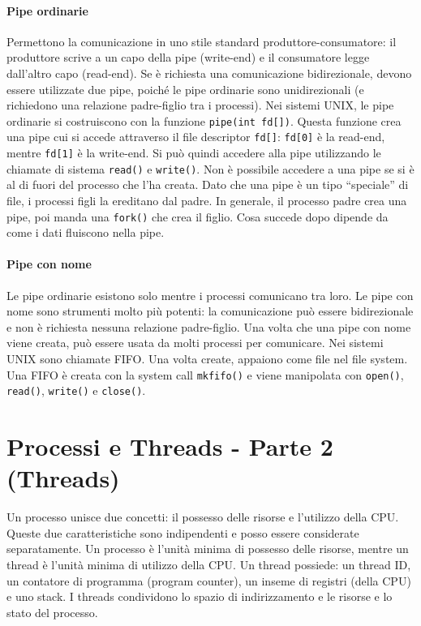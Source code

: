 \documentclass[a4paper]{article}
\begin{document}
\paragraph{Pipe ordinarie} Permettono la comunicazione in uno stile standard produttore-consumatore: il produttore scrive a un capo della pipe (write-end) e il consumatore legge dall'altro capo (read-end). Se è richiesta una comunicazione bidirezionale, devono essere utilizzate due pipe, poiché le pipe ordinarie sono unidirezionali (e richiedono una relazione padre-figlio tra i processi). \newline
Nei sistemi UNIX, le pipe ordinarie si costruiscono con la funzione \texttt{pipe(int fd[])}. Questa funzione crea una pipe cui si accede attraverso il file descriptor \texttt{fd[]}: \texttt{fd[0]} è la read-end, mentre \texttt{fd[1]} è la write-end. Si può quindi accedere alla pipe utilizzando le chiamate di sistema \texttt{read()} e \texttt{write()}. Non è possibile accedere a una pipe se si è al di fuori del processo che l'ha creata. Dato che una pipe è un tipo ``speciale'' di file, i processi figli la ereditano dal padre. In generale, il processo padre crea una pipe, poi manda una \texttt{fork()} che crea il figlio. Cosa succede dopo dipende da come i dati fluiscono nella pipe.

\paragraph{Pipe con nome} Le pipe ordinarie esistono solo mentre i processi comunicano tra loro. Le pipe con nome sono strumenti molto più potenti: la comunicazione può essere bidirezionale e non è richiesta nessuna relazione padre-figlio. Una volta che una pipe con nome viene creata, può essere usata da molti processi per comunicare. Nei sistemi UNIX sono chiamate FIFO. Una volta create, appaiono come file nel file system. Una FIFO è creata con la system call \texttt{mkfifo()} e viene manipolata con \texttt{open()}, \texttt{read()}, \texttt{write()} e \texttt{close()}.


\section{Processi e Threads - Parte 2 (Threads)}

Un processo unisce due concetti: il possesso delle risorse e l'utilizzo della CPU. Queste due caratteristiche sono indipendenti e posso essere considerate separatamente. \newline
Un processo è l'unità minima di possesso delle risorse, mentre un thread è l'unità minima di utilizzo della CPU. Un thread possiede: un thread ID, un contatore di programma (program counter), un inseme di registri (della CPU) e uno stack. I threads condividono lo spazio di indirizzamento e le risorse e lo stato del processo.
\end{document}
